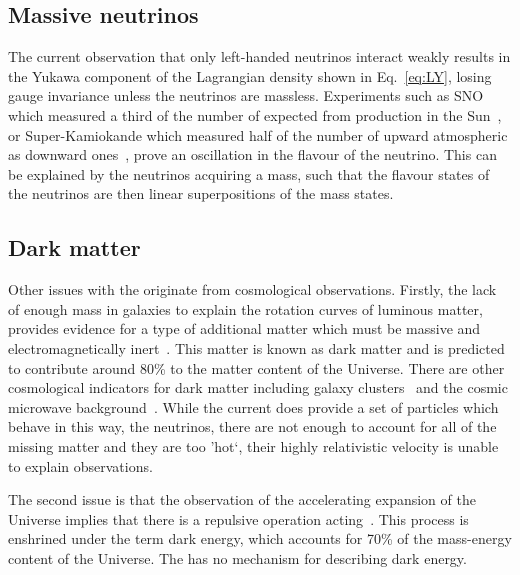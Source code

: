 \subsection{Massive neutrinos} %
\label{sub:massive_neutrinos}

The current observation that only left-handed neutrinos interact weakly results in the Yukawa component of the Lagrangian density shown in Eq.~\ref{eq:LY}, losing gauge invariance unless the neutrinos are massless.
Experiments such as SNO which measured a third of the number of \nue{} expected from production in the Sun~\cite{Th:SNO}, or Super-Kamiokande which measured half of the number of upward atmospheric \numu{} as downward ones~\cite{Th:SuperK}, prove an oscillation in the flavour of the neutrino.
This can be explained by the neutrinos acquiring a mass, such that the flavour states of the neutrinos are then linear superpositions of the mass states.

\subsection{Dark matter} %
\label{sub:dark_matter}

Other issues with the \SM{} originate from cosmological observations.
Firstly, the lack of enough mass in galaxies to explain the rotation curves of luminous matter, provides evidence for a type of additional matter which must be massive and electromagnetically inert~\cite{Th:DM1}.
This matter is known as dark matter and is predicted to contribute around 80\% to the matter content of the Universe. 
There are other cosmological indicators for dark matter including galaxy clusters~\cite{Th:DM2} and the cosmic microwave background~\cite{Th:DM3}.
While the current \SM{} does provide a set of particles which behave in this way, the neutrinos, there are not enough to account for all of the missing matter and they are too 'hot`, \ie{} their highly relativistic velocity is unable to explain observations.

The second issue is that the observation of the accelerating expansion of the Universe implies that there is a repulsive operation acting~\cite{Th:DM4}.
This process is enshrined under the term dark energy, which accounts for 70\% of the mass-energy content of the Universe.
The \SM{} has no mechanism for describing dark energy.

